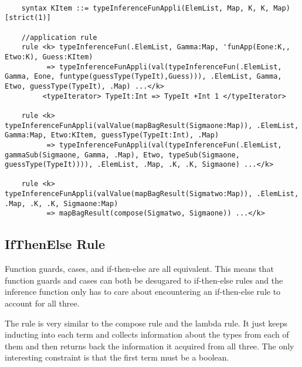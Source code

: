 \begin{lstlisting}

    syntax KItem ::= typeInferenceFunAppli(ElemList, Map, K, K, Map) [strict(1)]

    //application rule
    rule <k> typeInferenceFun(.ElemList, Gamma:Map, 'funApp(Eone:K,, Etwo:K), Guess:KItem)
          => typeInferenceFunAppli(val(typeInferenceFun(.ElemList, Gamma, Eone, funtype(guessType(TypeIt),Guess))), .ElemList, Gamma, Etwo, guessType(TypeIt), .Map) ...</k>
         <typeIterator> TypeIt:Int => TypeIt +Int 1 </typeIterator>

    rule <k> typeInferenceFunAppli(valValue(mapBagResult(Sigmaone:Map)), .ElemList, Gamma:Map, Etwo:KItem, guessType(TypeIt:Int), .Map)
          => typeInferenceFunAppli(val(typeInferenceFun(.ElemList, gammaSub(Sigmaone, Gamma, .Map), Etwo, typeSub(Sigmaone, guessType(TypeIt)))), .ElemList, .Map, .K, .K, Sigmaone) ...</k>

    rule <k> typeInferenceFunAppli(valValue(mapBagResult(Sigmatwo:Map)), .ElemList, .Map, .K, .K, Sigmaone:Map)
          => mapBagResult(compose(Sigmatwo, Sigmaone)) ...</k>

\end{lstlisting}

\subsection{IfThenElse Rule}

Function guards, cases, and if-then-else are all equivalent. This means that function guards and cases can both be desugared to if-then-else rules and the inference function only has to care about encountering an if-then-else rule to account for all three.

The rule is very similar to the compose rule and the lambda rule. It just keeps inducting into each term and collects information about the types from each of them and then returns back the information it acquired from all three. The only interesting constraint is that the first term must be a boolean.

\begin{prooftree}
\end{prooftree}

